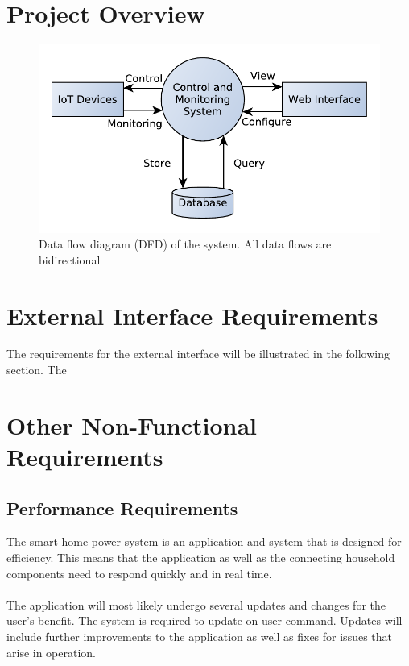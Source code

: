 \documentclass[11pt, a4paper]{article}
\begin{document}
	\section{Project Overview}
	\begin{figure}
		\includegraphics[width=\columnwidth]{data-flow-1}
		\caption{Data flow diagram (DFD) of the system. All data flows are bidirectional}
	\end{figure}
	
	
	\section{External Interface Requirements}
	The requirements for the external interface will be illustrated in the following section. The 
	
	\section{Other Non-Functional Requirements}
	
	\subsection{Performance Requirements}
	The smart home power system is an application and system that is designed for efficiency. This means that the application as well as the connecting household components need to respond quickly and in real time. 
	\\\\
	The application will most likely undergo several updates and changes for the user's benefit. The system is required to update on user command. Updates will include further improvements to the application as well as fixes for issues that arise in operation.
	
\end{document}
